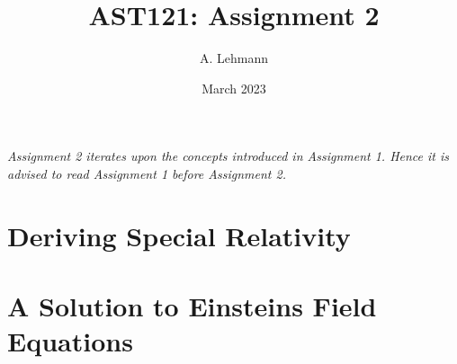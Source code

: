\documentclass{article}
\title{AST121: Assignment 2}
\author{A. Lehmann}
\date{March 2023}
\begin{document}
	\maketitle
	\textit{Assignment 2 iterates upon the concepts introduced in Assignment 1. Hence it is advised to read Assignment 1 before Assignment 2. }
	\tableofcontents
	\newpage 
	\section{}
	
	
	
	
	
	
	\section{Deriving Special Relativity}
	
	
	
	
	
	
	
	
	\section{A Solution to Einsteins Field Equations}
\end{document}
